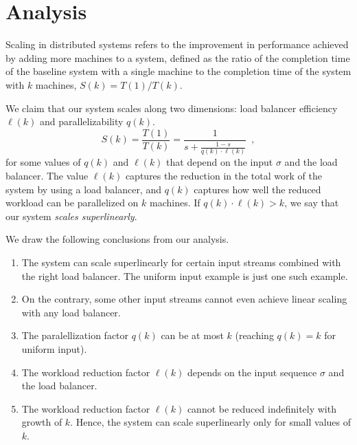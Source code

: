 \section{Analysis}\label{sec:analytical-findings}

Scaling in distributed systems refers to the improvement in performance achieved by adding more machines to a system, defined as the ratio of the completion time of the baseline system with a single machine to the completion time of the system with $k$ machines, $S(k) = T(1) / T(k)$.


We claim that our system scales along two dimensions: load balancer efficiency $\ell(k)$ and parallelizability $q(k)$.
\begin{displaymath}
    S(k) = \frac{T(1)}{T(k)} = \frac{1}{s + \frac{1-s}{q(k) \cdot \ell(k)}} \enspace ,
\end{displaymath}
for some values of $q(k)$ and $\ell(k)$ that depend on the input $\sigma$ and the load balancer.
The value $\ell(k)$ captures the reduction in the total work of the system by using a load balancer, and $q(k)$ captures how well the reduced workload can be parallelized on $k$ machines.
If $q(k) \cdot \ell(k) > k$, we say that our system \emph{scales superlinearly}.


We draw the following conclusions from our analysis.
\begin{enumerate}
	\item The system can scale superlinearly for certain input streams combined with the right load balancer.
		The uniform input example is just one such example.
	\item On the contrary, some other input streams cannot even achieve linear scaling with any load balancer.
	\item The paralellization factor $q(k)$ can be at most $k$ (reaching $q(k)=k$ for uniform input).
	\item The workload reduction factor $\ell(k)$ depends on the input sequence $\sigma$ and the load balancer.
	\item The workload reduction factor $\ell(k)$ cannot be reduced indefinitely with growth of $k$. Hence, the system can scale superlinearly only for small values of $k$. 
\end{enumerate} 


